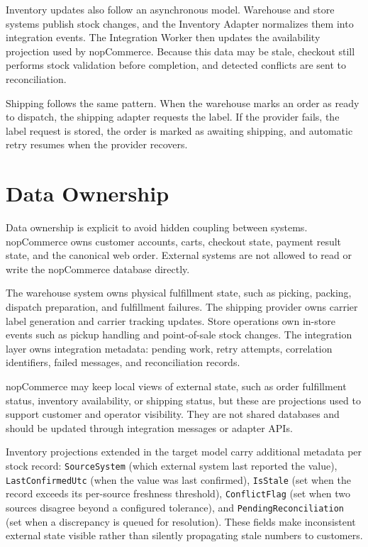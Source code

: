 Inventory updates also follow an asynchronous model. Warehouse and store systems publish stock
changes, and the Inventory Adapter normalizes them into integration events. The Integration
Worker then updates the availability projection used by nopCommerce. Because this data may be
stale, checkout still performs stock validation before completion, and detected conflicts are
sent to reconciliation.

Shipping follows the same pattern. When the warehouse marks an order as ready to dispatch, the
shipping adapter requests the label. If the provider fails, the label request is stored, the order
is marked as awaiting shipping, and automatic retry resumes when the provider recovers.

\section{Data Ownership}
\label{sec:data-ownership}

Data ownership is explicit to avoid hidden coupling between systems. nopCommerce owns customer
accounts, carts, checkout state, payment result state, and the canonical web order. External
systems are not allowed to read or write the nopCommerce database directly.

The warehouse system owns physical fulfillment state, such as picking, packing, dispatch
preparation, and fulfillment failures. The shipping provider owns carrier label generation and
carrier tracking updates. Store operations own in-store events such as pickup handling and
point-of-sale stock changes. The integration layer owns integration metadata: pending work,
retry attempts, correlation identifiers, failed messages, and reconciliation records.

nopCommerce may keep local views of external state, such as order fulfillment status, inventory
availability, or shipping status, but these are projections used to support customer and operator
visibility. They are not shared databases and should be updated through integration messages or
adapter APIs.

Inventory projections extended in the target model carry additional metadata per stock record:
\texttt{SourceSystem} (which external system last reported the value), \texttt{LastConfirmedUtc}
(when the value was last confirmed), \texttt{IsStale} (set when the record exceeds its
per-source freshness threshold), \texttt{ConflictFlag} (set when two sources disagree beyond a
configured tolerance), and \texttt{PendingReconciliation} (set when a discrepancy is queued for
resolution). These fields make inconsistent external state visible rather than silently
propagating stale numbers to customers.

